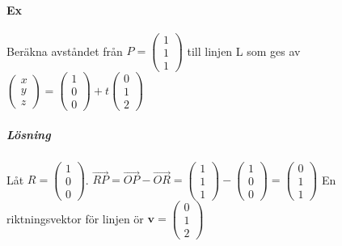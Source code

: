 \paragraph{Ex} Beräkna avståndet från $P=\begin{pmatrix}1\\1\\1\end{pmatrix}$ 
till linjen L som ges av $\begin{pmatrix}
    x\\y\\z
\end{pmatrix}=\begin{pmatrix}
    1\\0\\0
\end{pmatrix}+t\begin{pmatrix}
    0\\1\\2
\end{pmatrix}$
\subparagraph{Lösning} Låt $R=\begin{pmatrix}
    1\\0\\0
\end{pmatrix}$.
$\overrightarrow{RP}=\overrightarrow{OP}-\overrightarrow{OR}=\begin{pmatrix}
    1\\1\\1
\end{pmatrix}-\begin{pmatrix}
    1\\0\\0
\end{pmatrix}=\begin{pmatrix}
    0\\1\\1
\end{pmatrix}$
En riktningsvektor för linjen ör $\bm{v}=\begin{pmatrix}
    0\\1\\2
\end{pmatrix}$
